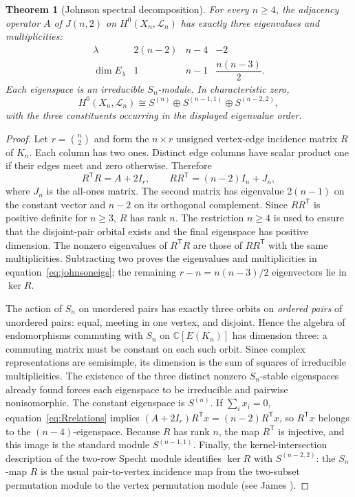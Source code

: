 \documentclass[12pt,letterpaper]{article}
\newtheorem{theorem}{Theorem}[section]
\theoremstyle{definition}
\theoremstyle{remark}
\numberwithin{equation}{section}
\newcommand{\CC}{\mathbb C}
\newcommand{\LL}{\mathcal L}
\begin{document}
\begin{theorem}[Johnson spectral decomposition]\label{thm:johnson}
For every $n\geq4$, the adjacency operator $A$ of $J(n,2)$ on $H^0(X_n,\LL_n)$ has exactly three eigenvalues and multiplicities:
\begin{equation}\label{eq:johnsoneigs}
\begin{array}{c|ccc}
\lambda&2(n-2)&n-4&-2\\\hline
\dim E_\lambda&1&n-1&\dfrac{n(n-3)}2.
\end{array}
\end{equation}
Each eigenspace is an irreducible $S_n$-module. In characteristic zero,
\begin{equation}\label{eq:specht}
H^0(X_n,\LL_n)\cong
S^{(n)}\oplus S^{(n-1,1)}\oplus S^{(n-2,2)},
\end{equation}
with the three constituents occurring in the displayed eigenvalue order.
\end{theorem}
\begin{proof}
Let $r=\binom n2$ and form the $n\times r$ unsigned vertex-edge incidence matrix $R$ of $K_n$. Each column has two ones. Distinct edge columns have scalar product one if their edges meet and zero otherwise. Therefore
\begin{equation}\label{eq:Rrelations}
R^{\mathsf T}R=A+2I_r,
\qquad
RR^{\mathsf T}=(n-2)I_n+J_n,
\end{equation}
where $J_n$ is the all-ones matrix. The second matrix has eigenvalue $2(n-1)$ on the constant vector and $n-2$ on its orthogonal complement. Since $RR^{\mathsf T}$ is positive definite for $n\geq3$, $R$ has rank $n$. The restriction $n\geq4$ is used to ensure that the disjoint-pair orbital exists and the final eigenspace has positive dimension. The nonzero eigenvalues of $R^{\mathsf T}R$ are those of $RR^{\mathsf T}$ with the same multiplicities. Subtracting two proves the eigenvalues and multiplicities in equation~\eqref{eq:johnsoneigs}; the remaining $r-n=n(n-3)/2$ eigenvectors lie in $\ker R$.

The action of $S_n$ on unordered pairs has exactly three orbits on \emph{ordered pairs} of unordered pairs: equal, meeting in one vertex, and disjoint. Hence the algebra of endomorphisms commuting with $S_n$ on $\CC[E(K_n)]$ has dimension three: a commuting matrix must be constant on each such orbit. Since complex representations are semisimple, its dimension is the sum of squares of irreducible multiplicities. The existence of the three distinct nonzero $S_n$-stable eigenspaces already found forces each eigenspace to be irreducible and pairwise nonisomorphic. The constant eigenspace is $S^{(n)}$. If $\sum_i x_i=0$, equation~\eqref{eq:Rrelations} implies $(A+2I_r)R^{\mathsf T}x=(n-2)R^{\mathsf T}x$, so $R^{\mathsf T}x$ belongs to the $(n-4)$-eigenspace. Because $R$ has rank $n$, the map $R^{\mathsf T}$ is injective, and this image is the standard module $S^{(n-1,1)}$. Finally, the kernel-intersection description of the two-row Specht module identifies $\ker R$ with $S^{(n-2,2)}$: the $S_n$-map $R$ is the usual pair-to-vertex incidence map from the two-subset permutation module to the vertex permutation module (see James \cite{Ja78}).
\end{proof}
\end{document}
